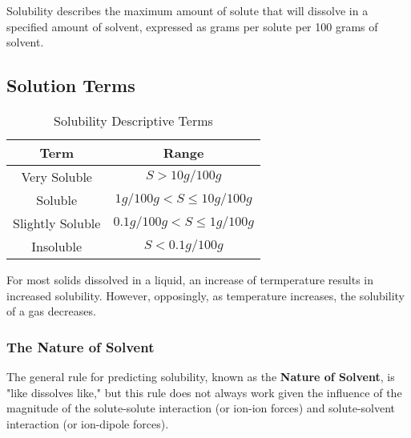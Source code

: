\noindent
{}

\begin{defn}
Solubility describes the maximum amount of solute that will dissolve in a specified amount of solvent, expressed as grams per solute per 100 grams of solvent.
\end{defn}

\subsection{Solution Terms}

\begin{table}[H]
\centering
\begin{tabular}{|c|c|}
\hline
Term & Range \\
\hline
Very Soluble & $S > 10g/100g$ \\
Soluble & $1g/100g < S \le 10g/100g$ \\
Slightly Soluble & $0.1g/100g < S \le 1g/100g$ \\
Insoluble & $S < 0.1g/100g$ \\
\hline
\end{tabular}
\caption{Solubility Descriptive Terms}
\end{table}

\noindent
For most solids dissolved in a liquid, an increase of termperature results in increased solubility. However, opposingly, as temperature increases, the solubility of a gas decreases.

\subsubsection{The Nature of Solvent}

\begin{defn}
The general rule for predicting solubility, known as the \textbf{Nature of Solvent}, is "like dissolves like," but this rule does not always work given the influence of the magnitude of the solute-solute interaction (or ion-ion forces) and solute-solvent interaction (or ion-dipole forces).
\end{defn}

\noindent
{} \\

